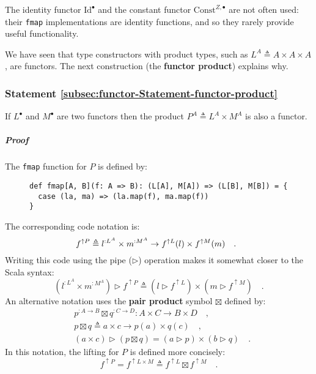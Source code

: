 The identity functor $\text{Id}^{\bullet}$ and the constant functor
$\text{Const}^{Z,\bullet}$ are not often used: their \lstinline!fmap!
implementations are identity functions, and so they rarely provide
useful functionality. 

We have seen that type constructors with product types, such as $L^{A}\triangleq A\times A\times A$,
are functors. The next construction (the \textbf{functor
product}) explains why.

\subsubsection{Statement \label{subsec:functor-Statement-functor-product}\ref{subsec:functor-Statement-functor-product}}

If $L^{\bullet}$ and $M^{\bullet}$ are two functors then the product
$P^{A}\triangleq L^{A}\times M^{A}$ is also a functor.

\subparagraph{Proof}

The \lstinline!fmap! function for $P$ is defined by:

\begin{wrapfigure}{l}{0.595\columnwidth}%
\vspace{-0.9\baselineskip}
\begin{lstlisting}
def fmap[A, B](f: A => B): (L[A], M[A]) => (L[B], M[B]) = {
  case (la, ma) => (la.map(f), ma.map(f))
}
\end{lstlisting}

\vspace{-1.5\baselineskip}
\end{wrapfigure}%

\noindent The corresponding code notation is:
\[
\negthickspace\negthickspace f^{\uparrow P}\triangleq l^{:L^{A}}\times m^{:M^{A}}\rightarrow f^{\uparrow L}(l)\times f^{\uparrow M}(m)\quad.
\]
Writing this code using the pipe ($\triangleright$) operation makes
it somewhat closer to the Scala syntax:
\begin{equation}
(l^{:L^{A}}\times m^{:M^{A}})\triangleright f^{\uparrow P}\triangleq(l\triangleright f^{\uparrow L})\times(m\triangleright f^{\uparrow M})\quad.\label{eq:f-def-of-functor-product-lift}
\end{equation}
An alternative notation uses the \textbf{pair
product} symbol $\boxtimes$ defined by:
\begin{align*}
 & p^{:A\rightarrow B}\boxtimes q^{:C\rightarrow D}:A\times C\rightarrow B\times D\quad,\\
 & p\boxtimes q\triangleq a\times c\rightarrow p(a)\times q(c)\quad,\\
 & (a\times c)\triangleright\left(p\boxtimes q\right)=\left(a\triangleright p\right)\times\left(b\triangleright q\right)\quad.
\end{align*}
In this notation, the lifting for $P$ is defined more concisely:
\begin{equation}
f^{\uparrow P}=f^{\uparrow L\times M}\triangleq f^{\uparrow L}\boxtimes f^{\uparrow M}\quad.\label{eq:def-of-functor-product-fmap}
\end{equation}

